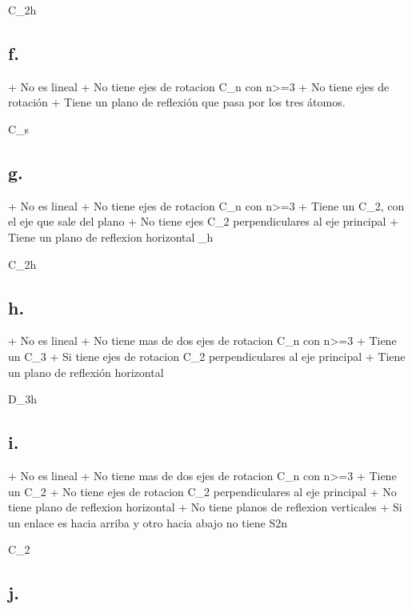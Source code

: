 C_2h


\subsection*{f.}

+ No es lineal
+ No tiene ejes de rotacion C_n con n>=3
+ No tiene ejes de rotación
+ Tiene un plano de reflexión que pasa por los tres átomos.


C_s


\subsection*{g. }

+ No es lineal
+ No tiene ejes de rotacion C_n con n>=3
+ Tiene un C_2, con el eje que sale del plano
+ No tiene ejes C_2 perpendiculares al eje principal
+ Tiene un plano de reflexion horizontal \sigma_h


C_2h



\subsection*{h. }

+ No es lineal
+ No tiene mas de dos ejes de rotacion C_n con n>=3
+ Tiene un C_3
+ Si tiene ejes de rotacion C_2 perpendiculares al eje principal
+ Tiene un plano de reflexión horizontal

D_3h


\subsection*{i. }

+ No es lineal
+ No tiene mas de dos ejes de rotacion C_n con n>=3
+ Tiene un C_2
+ No tiene ejes de rotacion C_2 perpendiculares al eje principal
+ No tiene plano de reflexion horizontal
+ No tiene planos de reflexion verticales
+ Si un enlace es hacia arriba y otro hacia abajo no tiene S2n


C_2



\subsection*{j. }

